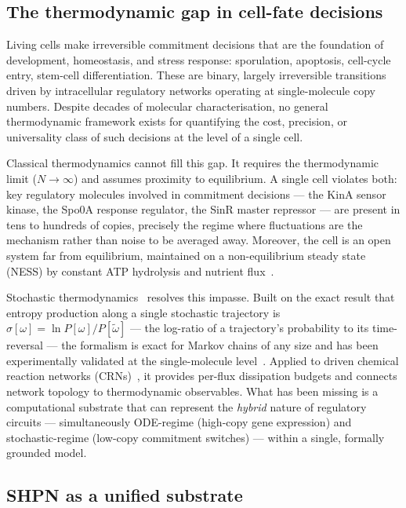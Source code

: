 \documentclass[11pt,a4paper]{article}
\newcommand{\TrajEPR}[1]{\sigma[#1]}
\newcommand{\trev}[1]{\tilde{#1}}
\begin{document}
\subsection*{The thermodynamic gap in cell-fate decisions}

Living cells make irreversible commitment decisions that are the
foundation of development, homeostasis, and stress response:
sporulation, apoptosis, cell-cycle entry, stem-cell differentiation.
These are binary, largely irreversible transitions driven by intracellular
regulatory networks operating at single-molecule copy numbers.
Despite decades of molecular characterisation, no general thermodynamic
framework exists for quantifying the cost, precision, or universality class
of such decisions at the level of a single cell.

Classical thermodynamics cannot fill this gap.
It requires the thermodynamic limit ($N \to \infty$) and assumes
proximity to equilibrium.
A single cell violates both: key regulatory molecules involved in
commitment decisions --- the KinA sensor kinase, the Spo0A response
regulator, the SinR master repressor --- are present in tens to hundreds
of copies, precisely the regime where fluctuations are the mechanism
rather than noise to be averaged away.
Moreover, the cell is an open system far from equilibrium, maintained on
a non-equilibrium steady state (NESS) by constant ATP hydrolysis and
nutrient flux~\cite{Schnakenberg1976,Hill1977}.

Stochastic thermodynamics~\cite{Seifert2012} resolves this impasse.
Built on the exact result that entropy production along a single
stochastic trajectory is $\TrajEPR{\omega} = \ln P[\omega]/P[\trev\omega]$
--- the log-ratio of a trajectory's probability to its time-reversal ---
the formalism is exact for Markov chains of any size and has been
experimentally validated at the single-molecule
level~\cite{Liphardt2002,Wang2002,Crooks1999,Jarzynski1997}.
Applied to driven chemical reaction networks (CRNs)~\cite{Rao2018},
it provides per-flux dissipation budgets and connects network topology
to thermodynamic observables.
What has been missing is a computational substrate that can represent the
\emph{hybrid} nature of regulatory circuits --- simultaneously ODE-regime
(high-copy gene expression) and stochastic-regime (low-copy commitment
switches) --- within a single, formally grounded model.

\subsection*{SHPN as a unified substrate}
\end{document}
